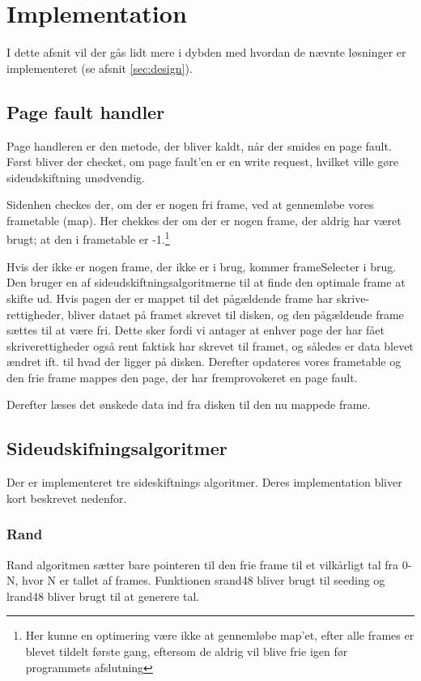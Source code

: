 \section{Implementation}
I dette afsnit vil der gås lidt mere i dybden med hvordan de nævnte løsninger er implementeret (se afsnit \ref{sec:design}).

\subsection{Page fault handler}
Page handleren er den metode, der bliver kaldt, når der smides en page fault. Først bliver der checket, om page fault'en er en write request, hvilket ville gøre sideudskiftning unødvendig.

Sidenhen checkes der, om der er nogen fri frame, ved at gennemløbe vores frametable (map). Her chekkes der om der er nogen frame, der aldrig har været brugt; at den i frametable er -1.\footnote{Her kunne en optimering være ikke at gennemløbe map'et, efter alle frames er blevet tildelt første gang, eftersom de aldrig vil blive frie igen før programmets afslutning}

Hvis der ikke er nogen frame, der ikke er i brug, kommer frameSelecter i brug. Den bruger en af sideudskiftningsalgoritmerne til at finde den optimale frame at skifte ud. Hvis pagen der er mappet til det pågældende frame har skrive-rettigheder, bliver dataet på framet skrevet til disken, og den pågældende frame sættes til at være fri. Dette sker fordi vi antager at enhver page der har fået skriverettigheder også rent faktisk har skrevet til framet, og således er data blevet ændret ift. til hvad der ligger på disken. Derefter opdateres vores frametable og den frie frame mappes den page, der har fremprovokeret en page fault.

Derefter læses det ønskede data ind fra disken til den nu mappede frame.

\subsection{Sideudskifningsalgoritmer}
Der er implementeret tre sideskiftnings algoritmer. Deres implementation bliver kort beskrevet nedenfor.

\subsubsection*{Rand}
Rand algoritmen sætter bare pointeren til den frie frame til et vilkårligt tal fra 0-N, hvor N er tallet af frames. Funktionen srand48 bliver brugt til seeding og lrand48 bliver brugt til at generere tal.

